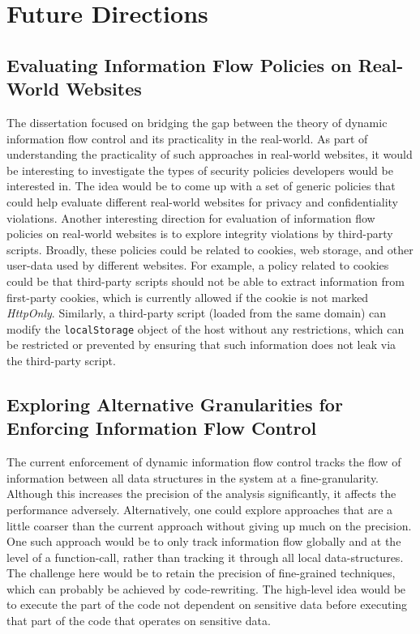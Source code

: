\chapter{Future Directions}
\label{ch:future}

\section{Evaluating Information Flow Policies on Real-World
  Websites}
The dissertation focused on bridging the gap between the theory
of dynamic information flow control and its practicality in the
real-world. As part of understanding the practicality of such
approaches in real-world websites, it would be interesting to
investigate the types of security policies developers would be
interested in. The idea would be to come up with a set of generic
policies that could help evaluate different real-world websites for
privacy and confidentiality violations. Another interesting direction
for evaluation of information flow policies on real-world websites is
to explore integrity violations by third-party scripts. Broadly, these
policies could be related to cookies, web  storage, and other
user-data used by different websites. For example, a policy related to
cookies could be that third-party scripts should not be able to
extract information from first-party cookies, which is currently
allowed if the cookie is not marked \emph{HttpOnly}. Similarly, a
third-party script (loaded from the same domain) can modify the
\texttt{localStorage} object of the host without any restrictions,
which can be restricted or prevented by ensuring that such information
does not leak via the  third-party script. 

\section{Exploring Alternative Granularities for Enforcing
  Information Flow Control}
The current enforcement of dynamic information flow control tracks the
flow of information between all data structures in the system at a
fine-granularity. Although this increases the precision of the
analysis significantly, it affects the performance
adversely. Alternatively, one could explore approaches that are a 
little coarser than the current approach without giving up much on the 
precision. One such approach would be to only track information flow
globally and at the level of a function-call, rather than tracking it
through all local data-structures. The challenge here would be to
retain the precision of fine-grained techniques, which can probably be  
achieved by code-rewriting. The high-level idea would be to execute
the part of the code not dependent on sensitive data before executing
that part of the code that operates on sensitive data. 

